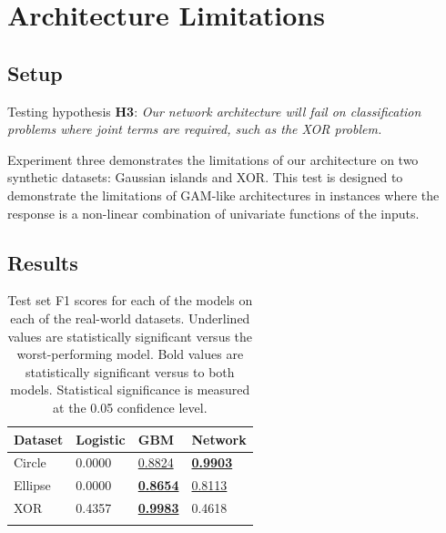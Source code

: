 
\section{Architecture Limitations}

\subsection{Setup}

Testing hypothesis \textbf{H3}: \textit{Our network architecture will fail on classification problems where joint terms are required, such as the XOR problem.}

Experiment three demonstrates the limitations of our architecture on two synthetic datasets: Gaussian islands and XOR. This test is designed to demonstrate the limitations of GAM-like architectures in instances where the response is a non-linear combination of univariate functions of the inputs. 

\subsection{Results}

\begin{longtable}[]{@{}llll@{}}%
    \toprule
    Dataset & Logistic & GBM & Network\tabularnewline
    \midrule
    \endhead
    Circle   & 0.0000 & \underline{0.8824} & \underline{\textbf{0.9903}} \tabularnewline
    Ellipse  & 0.0000 & \underline{\textbf{0.8654}} & \underline{0.8113} \tabularnewline
    XOR      & 0.4357 & \underline{\textbf{0.9983}} & 0.4618 \tabularnewline
    \bottomrule
    \caption{Test set F1 scores for each of the models on each of the real-world datasets. Underlined values are statistically significant versus the worst-performing model. Bold values are statistically significant versus to both models. Statistical significance is measured at the 0.05 confidence level.}
\end{longtable}


